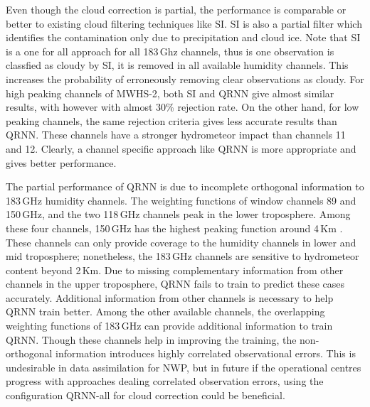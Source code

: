 \documentclass[amt]{copernicus}
\begin{document}
Even though the cloud correction is partial, the performance is comparable or better to existing cloud filtering techniques like SI. SI is also a partial filter which identifies the contamination only due to precipitation and cloud ice. Note that SI is a one for all approach for all 183\,Ghz channels, thus is one observation is classfied as cloudy by SI, it is removed in all available humidity channels. This increases the probability of erroneously removing clear observations as cloudy. For high peaking channels of MWHS-2, both SI and QRNN give almost similar results, with however with almost 30\% rejection rate. On the other hand, for low peaking channels, the same rejection criteria gives less accurate results than QRNN. These channels have a stronger hydrometeor impact than channels 11 and 12. Clearly, a channel specific approach like QRNN is more appropriate and gives better performance.

The partial performance of QRNN is due to incomplete orthogonal information to 183\,GHz humidity channels.  The weighting functions of window channels 89 and 150\,GHz, and the two 118\,GHz channels peak in the lower troposphere. Among these four channels, 150\,GHz has the highest peaking function around 4\,Km \cite{chen2020mwhs}. These channels can only provide coverage to the humidity channels in lower and mid troposphere; nonetheless, the 183\,GHz channels are sensitive to hydrometeor content beyond 2\,Km. Due to missing complementary information from other channels in the upper troposphere, QRNN fails to train to predict these cases accurately. Additional information from other channels is necessary to help QRNN train better. Among the other available channels, the overlapping weighting functions of 183\,GHz can provide additional information to train QRNN. Though these channels help in improving the training, the non-orthogonal information introduces highly correlated observational errors. This is undesirable in data assimilation for NWP, but in future if the operational centres progress with approaches dealing correlated observation errors, using the configuration QRNN-all for cloud correction could be beneficial.
\end{document}

